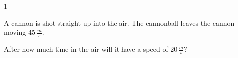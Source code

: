 
\AddToShipoutPicture*{\BackgroundPic}

\addtocounter {ProbNum} {1}

 
{\bf \Large{}} A cannon is shot straight up into the air. The cannonball leaves the cannon moving ${45~\tfrac{m}{s}}$.  

\bigskip  After how much time in the air will it have a speed of ${20~\tfrac{m}{s}}$? 



\vfill
\newpage